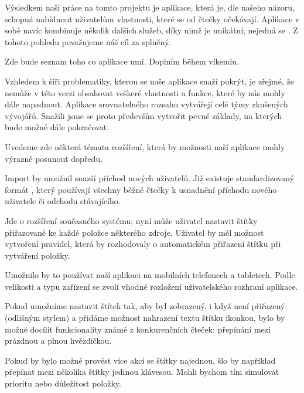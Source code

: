 
Výsledkem naší práce na tomto projektu je aplikace, která je, dle našeho názoru, schopná nabídnout uživatelům vlastnosti, které se od čtečky očekávají.
Aplikace v sobě navíc kombinuje několik dalších služeb, díky nimž je unikátní; nejedná se .
Z tohoto pohledu považujeme náš cíl za splněný.


Zde bude seznam toho co aplikace umí.
Doplním během víkendu.



Vzhledem k šíři problematiky, kterou se naše aplikace snaží pokrýt, je zřejmé, že nemůže v této verzi obsahovat veškeré vlastnosti a funkce, které by nás mohly dále napadnout.
Aplikace srovnatelného rozsahu vytvářejí celé týmy zkušených vývojářů.
Snažili jsme se proto především vytvořit pevné základy, na kterých bude možné dále pokračovat.

Uvedeme zde některá témata rozšíření, která by možnosti naší aplikace mohly výrazně posunout dopředu.

Import by umožnil snazší příchod nových uživatelů.
Již existuje standardizovaný formát , který používají všechny běžné čtečky k usnadnění příchodu nového uživatele či odchodu stávajícího.

Jde o rozšíření současného systému; nyní může uživatel nastavit štítky přiřazované ke každé položce některého zdroje.
Uživatel by měl možnost vytvoření pravidel, která by rozhodovaly o automatickém přiřazení štítku při vytváření položky.

Umožnilo by to používat naší aplikaci na mobilních telefonech a tabletech.
Podle velikosti a typu zařízení se zvolí vhodné rozložení uživatelského rozhraní aplikace.
 
Pokud umožníme nastavit štítek tak, aby byl zobrazený, i když není přiřazený (odlišným stylem) a přidáme možnost nahrazení textu štítku ikonkou, bylo by možné docílit funkcionality známé z konkurenčních čteček: přepínání mezi prázdnou a plnou hvězdičkou.

Pokud by bylo možné provést více akcí se štítky najednou, šlo by například přepínat mezi několika štítky jedinou klávesou.
Mohli bychom tím simulovat prioritu nebo důležitost položky.

